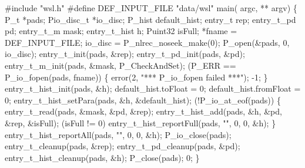 \begin{centercode}
#include "wsl.h"
#define DEF\_INPUT\_FILE  "data/wsl"
\mbox{}
 main( argc, ** argv) \{
  P\_t                   *pads;
  Pio\_disc\_t           *io\_disc;
  P\_hist                default\_hist;
  entry\_t               rep;
  entry\_t\_pd           pd;
  entry\_t\_m            mask;
  entry\_t\_hist         h;
  Puint32                isFull;
                *fname = DEF\_INPUT\_FILE;
\mbox{}
  io\_disc = P\_nlrec\_noseek\_make(0);
  P\_open(&pads, 0, io\_disc);
\mbox{}
  entry\_t\_init(pads, &rep);
  entry\_t\_pd\_init(pads, &pd);
  entry\_t\_m\_init(pads, &mask, P\_CheckAndSet);
\mbox{}
   (P\_ERR == P\_io\_fopen(pads, fname)) \{
    error(2, "*** P\_io\_fopen failed ***");
     -1;
  \}
\mbox{}
  entry\_t\_hist\_init(pads, &h);
  default\_hist.toFloat = 0;
  default\_hist.fromFloat = 0;
  entry\_t\_hist\_setPara(pads, &h, &default\_hist);
   (!P\_io\_at\_eof(pads)) \{
    entry\_t\_read(pads, &mask, &pd, &rep);
    entry\_t\_hist\_add(pads, &h, &pd, &rep, &isFull);
     (isFull != 0) entry\_t\_hist\_reportFull(pads, "", 0, 0, &h);
  \}
  entry\_t\_hist\_reportAll(pads, "", 0, 0, &h);
\mbox{}
  P\_io\_close(pads);
  entry\_t\_cleanup(pads, &rep);
  entry\_t\_pd\_cleanup(pads, &pd);
  entry\_t\_hist\_cleanup(pads, &h);
  P\_close(pads);
   0;
\}
\end{centercode}
